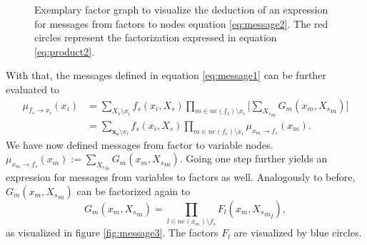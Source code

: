 \documentclass{sigkdd}
\begin{document}
\begin{figure}[h]
	\centering
	\caption{Exemplary factor graph to visualize the deduction of an expression for messages from factors to nodes equation \ref{eq:message2}. The red circles represent the factorization expressed in equation  \ref{eq:product2}.}\label{fig:message2}
\end{figure}

With that, the messages defined in equation \ref{eq:message1} can be further evaluated to
\begin{equation}\label{eq:message2}
\begin{split}
\mu_{f_s \rightarrow x_i}(x_i) &= \sum_{X_s \setminus x_i} f_s(x_i, X_s) \prod_{m \in ne(f_s) \setminus x_i} \Big[ \sum_{{X_s}_m} G_m(x_m, {X_s}_m)  \Big] \\ &= \sum_{\mathbf{x_s} \setminus x_i} f_s(x_i, X_s) \prod_{m \in ne(f_s) \setminus x_i} \mu_{x_m \rightarrow f_s}(x_m).
\end{split}
\end{equation}
We have now defined  messages from factor to variable nodes. $\mu_{x_m \rightarrow f_s}(x_m) :=\sum_{{X_s}_m} G_m(x_m, {X_s}_m)$. Going one step further yields an expression for messages from variables to factors as well. Analogously to before, $G_m(x_m, {X_s}_m)$ can be factorized again to 
\begin{equation}\label{eq:product3}
G_m(x_m,{X_s}_m) = \prod_{l \in ne(x_m) \setminus f_s} F_l(x_m, {{X_s}_m}_l),
\end{equation}
as visualized in figure \ref{fig:message3}. The factors $F_l$ are visualized by blue circles.
\end{document}
